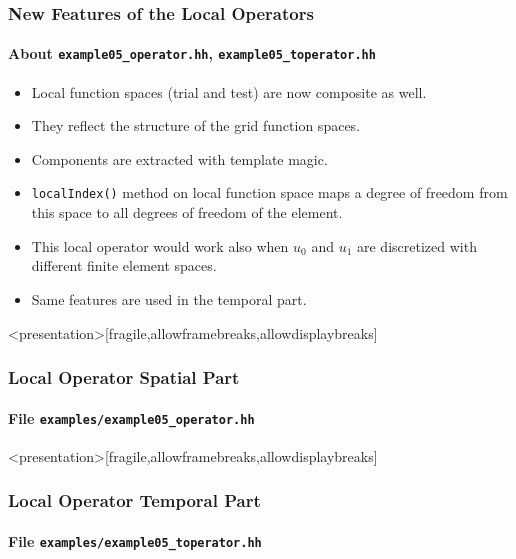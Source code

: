 \begin{frame}
\frametitle{New Features of the Local Operators}
\framesubtitle{About \lstinline{example05_operator.hh}, \lstinline{example05_toperator.hh}}
\begin{itemize}
\item Local function spaces (trial and test) are now composite as well.
\item They reflect the structure of the grid function spaces.
\item Components are extracted with template magic.
\item \lstinline{localIndex()} method on local function space maps
a degree of freedom from this space to all degrees of freedom of the element.
\item This local operator would work also when $u_0$ and $u_1$ are discretized
with different finite element spaces.
\item Same features are used in the temporal part.
\end{itemize}
\end{frame}

\begin{frame}<presentation>[fragile,allowframebreaks,allowdisplaybreaks]
\frametitle<presentation>{Local Operator Spatial Part}
\framesubtitle<presentation>{File \texttt{examples/example05\_operator.hh}}

\end{frame}

\begin{frame}<presentation>[fragile,allowframebreaks,allowdisplaybreaks]
\frametitle<presentation>{Local Operator Temporal Part}
\framesubtitle<presentation>{File \texttt{examples/example05\_toperator.hh}}

\end{frame}

